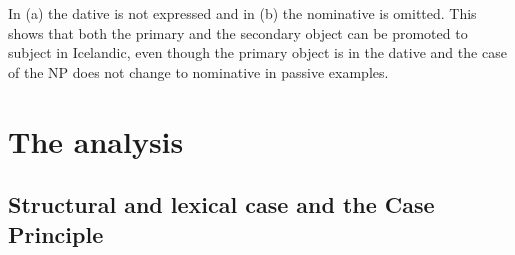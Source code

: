 \zl
In (a) the dative is not expressed and in (b) the nominative is omitted. This shows
that both the primary and the secondary object can be promoted to subject in Icelandic, even though
the primary object is in the dative and the case of the NP does not change to nominative in passive examples.














\section{The analysis}

\subsection{Structural and lexical case and the Case Principle}
\label{sec-struk-lex-kas}
\label{sec-struc-lex-kas}

